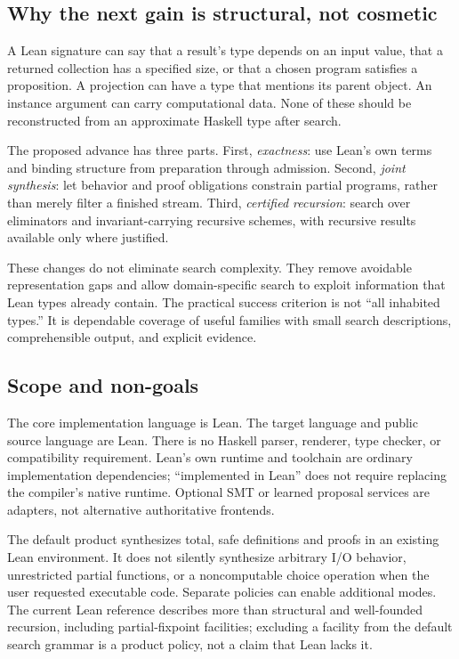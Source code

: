\documentclass[11pt,letterpaper]{article}
\theoremstyle{definition}\newtheorem{definition}[theorem]{Definition}
\theoremstyle{remark}\newtheorem{remark}[theorem]{Remark}
\begin{document}
\subsection{Why the next gain is structural, not cosmetic}

A Lean signature can say that a result's type depends on an input value, that a
returned collection has a specified size, or that a chosen program satisfies a
proposition. A projection can have a type that mentions its parent object.
An instance argument can carry computational data. None of these should be
reconstructed from an approximate Haskell type after search.

The proposed advance has three parts. First, \emph{exactness}: use Lean's own
terms and binding structure from preparation through admission. Second,
\emph{joint synthesis}: let behavior and proof obligations constrain partial
programs, rather than merely filter a finished stream. Third,
\emph{certified recursion}: search over eliminators and invariant-carrying
recursive schemes, with recursive results available only where justified.

These changes do not eliminate search complexity. They remove avoidable
representation gaps and allow domain-specific search to exploit information
that Lean types already contain. The practical success criterion is not
``all inhabited types.'' It is dependable coverage of useful families with
small search descriptions, comprehensible output, and explicit evidence.

\subsection{Scope and non-goals}

The core implementation language is Lean. The target language and public source
language are Lean. There is no Haskell parser, renderer, type checker, or
compatibility requirement. Lean's own runtime and toolchain are ordinary
implementation dependencies; ``implemented in Lean'' does not require replacing
the compiler's native runtime. Optional SMT or learned proposal services are
adapters, not alternative authoritative frontends.

The default product synthesizes total, safe definitions and proofs in an existing
Lean environment. It does not silently synthesize arbitrary I/O behavior,
unrestricted partial functions, or a noncomputable choice operation when the
user requested executable code. Separate policies can enable additional modes.
The current Lean reference describes more than structural and well-founded
recursion, including partial-fixpoint facilities; excluding a facility from the
default search grammar is a product policy, not a claim that Lean lacks it.
\cite{recursive}
\end{document}
